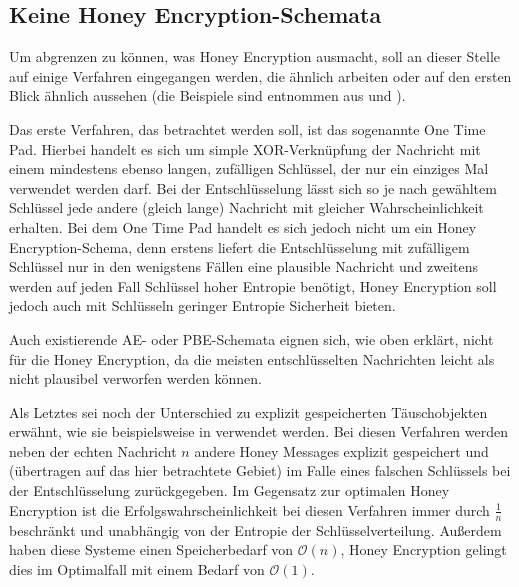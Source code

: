 \subsection{Keine Honey Encryption-Schemata}

Um abgrenzen zu können, was Honey Encryption ausmacht, soll an dieser Stelle auf einige Verfahren eingegangen werden, die ähnlich arbeiten oder auf den ersten Blick ähnlich aussehen (die Beispiele sind entnommen aus \cite{EURO2014} und \cite{IEEE2014}).

Das erste Verfahren, das betrachtet werden soll, ist das sogenannte One Time Pad. Hierbei handelt es sich um simple XOR-Verknüpfung der Nachricht mit einem mindestens ebenso langen, zufälligen Schlüssel, der nur ein einziges Mal verwendet werden darf. Bei der Entschlüsselung lässt sich so je nach gewähltem Schlüssel jede andere (gleich lange) Nachricht mit gleicher Wahrscheinlichkeit erhalten. Bei dem One Time Pad handelt es sich jedoch nicht um ein Honey Encryption-Schema, denn erstens liefert die Entschlüsselung mit zufälligem Schlüssel nur in den wenigstens Fällen eine plausible Nachricht und zweitens werden auf jeden Fall Schlüssel hoher Entropie benötigt, Honey Encryption soll jedoch auch mit Schlüsseln geringer Entropie Sicherheit bieten.

Auch existierende AE- oder PBE-Schemata eignen sich, wie oben erklärt, nicht für die Honey Encryption, da die meisten entschlüsselten Nachrichten leicht als nicht plausibel verworfen werden können.

Als Letztes sei noch der Unterschied zu explizit gespeicherten Täuschobjekten erwähnt, wie sie beispielsweise in \cite{ACM13} verwendet werden. Bei diesen Verfahren werden neben der echten Nachricht \(n\) andere Honey Messages explizit gespeichert und (übertragen auf das hier betrachtete Gebiet) im Falle eines falschen Schlüssels bei der Entschlüsselung zurückgegeben. Im Gegensatz zur optimalen Honey Encryption ist die Erfolgswahrscheinlichkeit bei diesen Verfahren immer durch \(\frac{1}{n}\) beschränkt und unabhängig von der Entropie der Schlüsselverteilung. Außerdem haben diese Systeme einen Speicherbedarf von \(\mathcal{O}(n)\), Honey Encryption gelingt dies im Optimalfall mit einem Bedarf von \(\mathcal{O}(1)\).

\newpage